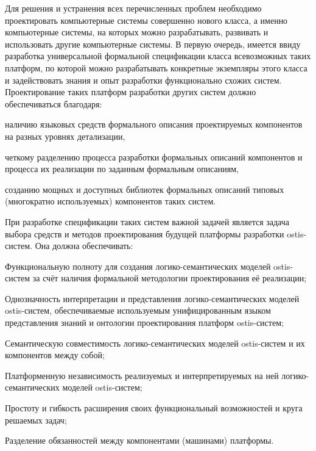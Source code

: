 Для решения и устранения всех перечисленных проблем необходимо проектировать компьютерные системы совершенно нового
класса, а именно компьютерные системы, на которых можно разрабатывать, развивать и использовать другие компьютерные
системы. В первую очередь, имеется ввиду разработка универсальной формальной спецификации класса всевозможных таких
платформ, по которой можно разрабатывать конкретные экземпляры этого класса и задействовать знания и опыт разработки
функционально схожих систем. Проектирование таких платформ разработки других систем должно обеспечиваться благодаря:
\begin{scnitemize}
    \item наличию языковых средств формального описания проектируемых компонентов на разных уровнях детализации,
    \item четкому разделению процесса разработки формальных описаний компонентов и процесса их реализации по заданным
    формальным описаниям,
    \item созданию мощных и доступных библиотек формальных описаний типовых (многократно используемых) компонентов
    таких систем.
\end{scnitemize}

При разработке спецификации таких систем важной задачей является задача выбора средств и методов проектирования
будущей платформы разработки ostis-систем. Она должна обеспечивать:
\begin{scnitemize}
    \item Функциональную полноту для создания логико-семантических моделей ostis-систем за счёт наличия формальной
    методологии проектирования её реализации;
    \item Однозначность интерпретации и представления логико-семантических моделей ostis-систем, обеспечиваемые
    используемым унифицированным языком представления знаний и онтологии проектирования платформ ostis-систем;
    \item Семантическую совместимость логико-семантических моделей ostis-систем и их компонентов между собой;
    \item Платформенную независимость реализуемых и интерпретируемых на ней логико-семантических моделей ostis-систем;
    \item Простоту и гибкость расширения своих функциональный возможностей и круга решаемых задач;
    \item Разделение обязанностей между компонентами (машинами) платформы.
\end{scnitemize}

